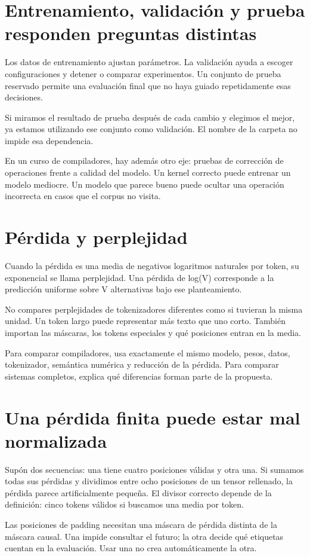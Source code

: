 \documentclass[12pt,a4paper,oneside]{report}
\begin{document}
\section{Entrenamiento, validación y prueba responden preguntas distintas}
Los datos de entrenamiento ajustan parámetros. La validación ayuda a escoger configuraciones y detener o comparar experimentos. Un conjunto de prueba reservado permite una evaluación final que no haya guiado repetidamente esas decisiones.

Si miramos el resultado de prueba después de cada cambio y elegimos el mejor, ya estamos utilizando ese conjunto como validación. El nombre de la carpeta no impide esa dependencia.

En un curso de compiladores, hay además otro eje: pruebas de corrección de operaciones frente a calidad del modelo. Un kernel correcto puede entrenar un modelo mediocre. Un modelo que parece bueno puede ocultar una operación incorrecta en casos que el corpus no visita.

\section{Pérdida y perplejidad}
Cuando la pérdida es una media de negativos logaritmos naturales por token, su exponencial se llama perplejidad. Una pérdida de log(V) corresponde a la predicción uniforme sobre V alternativas bajo ese planteamiento.

No compares perplejidades de tokenizadores diferentes como si tuvieran la misma unidad. Un token largo puede representar más texto que uno corto. También importan las máscaras, los tokens especiales y qué posiciones entran en la media.

Para comparar compiladores, usa exactamente el mismo modelo, pesos, datos, tokenizador, semántica numérica y reducción de la pérdida. Para comparar sistemas completos, explica qué diferencias forman parte de la propuesta.

\section{Una pérdida finita puede estar mal normalizada}
Supón dos secuencias: una tiene cuatro posiciones válidas y otra una. Si sumamos todas sus pérdidas y dividimos entre ocho posiciones de un tensor rellenado, la pérdida parece artificialmente pequeña. El divisor correcto depende de la definición: cinco tokens válidos si buscamos una media por token.

Las posiciones de padding necesitan una máscara de pérdida distinta de la máscara causal. Una impide consultar el futuro; la otra decide qué etiquetas cuentan en la evaluación. Usar una no crea automáticamente la otra.
\end{document}
